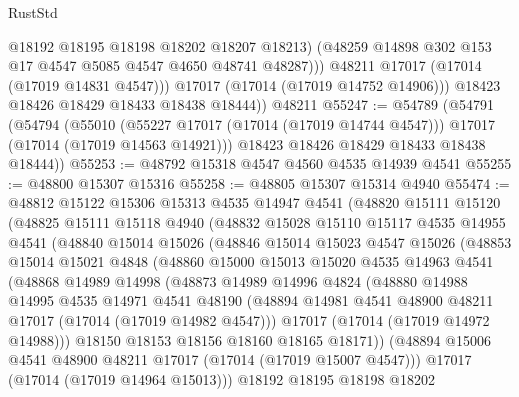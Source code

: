 \begin{lexlean}{RustStd}
\begin{coremodule}
                  @18192
                  @18195
                  @18198
                  @18202
                  @18207
                  @18213)
                (@48259 @14898 @302 @153 @17 @4547 @5085 @4547 @4650 @48741 @48287)))
            @48211
            @17017
            (@17014 (@17019 @14831 @4547)))
          @17017
          (@17014 (@17019 @14752 @14906)))
        @18423
        @18426
        @18429
        @18433
        @18438
        @18444))
    @48211
@55247 := @54789
    (@54791
      (@54794
        (@55010
          (@55227 @17017 (@17014 (@17019 @14744 @4547)))
          @17017
          (@17014 (@17019 @14563 @14921)))
        @18423
        @18426
        @18429
        @18433
        @18438
        @18444))
@55253 := @48792 @15318 @4547 @4560 @4535 @14939 @4541
@55255 := @48800 @15307 @15316
@55258 := @48805 @15307 @15314 @4940
@55474 := @48812
    @15122
    @15306
    @15313
    @4535
    @14947
    @4541
    (@48820
      @15111
      @15120
      (@48825
        @15111
        @15118
        @4940
        (@48832
          @15028
          @15110
          @15117
          @4535
          @14955
          @4541
          (@48840
            @15014
            @15026
            (@48846
              @15014
              @15023
              @4547
              @15026
              (@48853
                @15014
                @15021
                @4848
                (@48860
                  @15000
                  @15013
                  @15020
                  @4535
                  @14963
                  @4541
                  (@48868
                    @14989
                    @14998
                    (@48873
                      @14989
                      @14996
                      @4824
                      (@48880
                        @14988
                        @14995
                        @4535
                        @14971
                        @4541
                        @48190
                        (@48894 @14981 @4541 @48900 @48211 @17017 (@17014 (@17019 @14982 @4547)))
                        @17017
                        (@17014 (@17019 @14972 @14988)))
                      @18150
                      @18153
                      @18156
                      @18160
                      @18165
                      @18171))
                  (@48894 @15006 @4541 @48900 @48211 @17017 (@17014 (@17019 @15007 @4547)))
                  @17017
                  (@17014 (@17019 @14964 @15013)))
                @18192
                @18195
                @18198
                @18202

\end{coremodule}
\end{lexlean}
